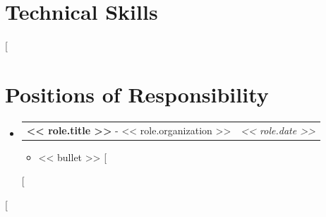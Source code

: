 \documentclass[a4paper,11pt]{article}
\makeatletter
\newcommand{\resumePOR}[3]{\vspace{0.5mm}\item\begin{tabular*}{0.97\textwidth}[t]{l@{\extracolsep{\fill}}r}\textbf{#1}\hspace{0.3mm}#2 & \textit{\small{#3}}\end{tabular*}\vspace{-2.2mm}}
\newcommand{\resumeSubHeadingListStart}{\begin{itemize}[leftmargin=*,labelsep=0mm]}
\newcommand{\resumeItemListStart}{\begin{justify}\begin{itemize}[leftmargin=3ex, rightmargin=2ex, noitemsep,labelsep=1.2mm,itemsep=0mm]\small}
\newcommand{\resumeSubHeadingListEnd}{\end{itemize}\vspace{2mm}}
\newcommand{\resumeItemListEnd}{\end{itemize}\end{justify}\vspace{-2mm}}
\makeatother
\begin{document}
\section{\textbf{Technical Skills}}

[%
\section{\textbf{Positions of Responsibility}}
\resumeSubHeadingListStart
  [%
  \resumePOR{<< role.title >> }{ - << role.organization >>}{<< role.date >>}
    \resumeItemListStart
      [%
      \item {<< bullet >>}
      [%
    \resumeItemListEnd
  [%
\resumeSubHeadingListEnd
[%
\end{document}
